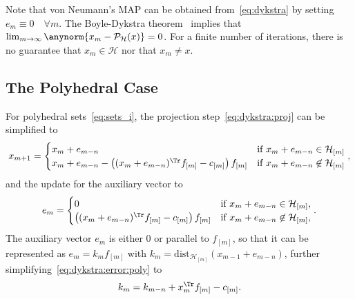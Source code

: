 \documentclass[hidelinks]{article}
\begin{document}
Note that von Neumann's MAP can be obtained from~\eqref{eq:dykstra} by setting $e_m \equiv 0\quad\forall m$. The Boyle-Dykstra theorem~\cite{DYKSTRA} implies that $\lim_{m\rightarrow\infty}\anynorm{x_m-\mathcal{P}_\mathcal{H}(x)}=0$. For a finite number of iterations, there is no guarantee that $x_m\in\mathcal{H}$ nor that $x_m\neq x$. 

\subsection{The Polyhedral Case}

For polyhedral sets~\eqref{eq:sets_i}, the projection step~\eqref{eq:dykstra:proj} can be simplified to
\begin{align}\label{eq:dykstra:proj:poly}
x_{m+1}=
\begin{cases}
x_{m}+e_{m-n} & \text{if } x_{m}+e_{m-n}\in\mathcal{H}_{[m]}\\
x_{m}+e_{m-n} - \left((x_{m}+e_{m-n})^\Tr f_{[m]} - c_{[m]}\right) f_{[m]} & \text{if } x_{m}+e_{m-n}\not\in\mathcal{H}_{[m]}
\end{cases},
\end{align}
and the update for the auxiliary vector to
\begin{align}\label{eq:dykstra:error:poly}
e_m=
\begin{cases}
0 & \text{if } x_{m}+e_{m-n}\in\mathcal{H}_{[m]},\\
\left((x_{m}+e_{m-n})^\Tr f_{[m]} - c_{[m]}\right) f_{[m]} & \text{if } x_{m}+e_{m-n}\not\in\mathcal{H}_{[m]},
\end{cases}.
\end{align}
The auxiliary vector $e_m$ is either $0$ or parallel to $f_{[m]}$, so that it can be represented as $e_m = k_m f_{[m]}$ with $k_m=\text{dist}_{\mathcal{H}_{[m]}}(x_{m-1}+e_{m-n})$, further simplifying~\eqref{eq:dykstra:error:poly} to
\begin{align}\label{eq:km}
k_m = k_{m-n} + x_m^\Tr f_{[m]} - c_{[m]}.
\end{align}
\end{document}
